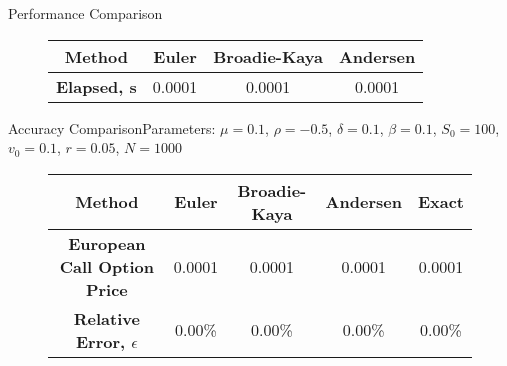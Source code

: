 \begin{frame}{Performance Comparison}{}
    \begin{figure}
        \begin{tabular}{|c|c|c|c|}\hline
            \textbf {Method} & \textbf {Euler} & \textbf {Broadie-Kaya} & \textbf {Andersen}\\
            \hline
            \textbf {Elapsed, s} & 0.0001 & 0.0001 & 0.0001\\
            \hline
        \end{tabular}
    \end{figure}
\end{frame}

\begin{frame}{Accuracy Comparison}{Parameters: $\mu = 0.1$, $\rho = -0.5$, $\delta = 0.1$, $\beta = 0.1$, $S_0 = 100$, $v_0 = 0.1$, $r = 0.05$, $N = 1000$}
    \begin{figure}
        \begin{tabular}{|c|c|c|c|c|}\hline
            \textbf {Method} & \textbf {Euler} & \textbf {Broadie-Kaya} & \textbf {Andersen} & \textbf {Exact}\\
            \hline
            \textbf {European Call Option Price} & 0.0001 & 0.0001 & 0.0001 & 0.0001\\
            \hline
            \textbf {Relative Error, $\epsilon$} & 0.00\% & 0.00\% & 0.00\% & 0.00\%\\
            \hline
        \end{tabular}
    \end{figure}
\end{frame}